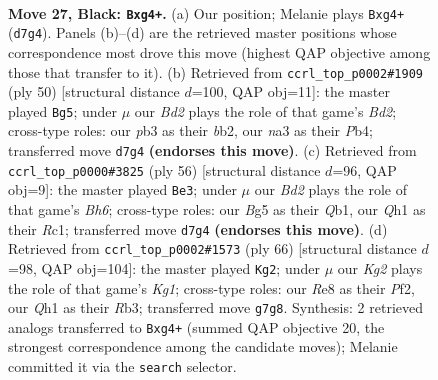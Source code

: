 \documentclass[11pt]{article}
\begin{document}
\clearpage

\begin{figure}[p]\centering
\begin{subfigure}{0.46\textwidth}\centering
\resizebox{\linewidth}{!}{%
\newchessgame
\chessboard[
  setfen={r3r3/1ppb2kp/5p2/p2p2b1/6P1/NPB1P3/P3KP2/RN5q b - - 2 27},
  showmover=false,
  pgfstyle=straightmove, color=movearrow, markmove={d7-g4}
]}
\caption{}
\end{subfigure}\hfill
\begin{subfigure}{0.46\textwidth}\centering
\resizebox{\linewidth}{!}{%
\newchessgame
\chessboard[
  setfen={3q4/1b1pnk2/p2p2r1/5p1Q/1P6/3P4/Pb1B2PP/4RR1K w - - 1 26},
  showmover=false,
  pgfstyle=straightmove, color=movearrow, markmove={d2-g5}
]}
\caption{}
\end{subfigure}
\\[4pt]
\begin{subfigure}{0.46\textwidth}\centering
\resizebox{\linewidth}{!}{%
\newchessgame
\chessboard[
  setfen={7r/1pbk1p1p/1rn1nPpB/pNp5/8/8/P5PP/1QR4K w - - 4 29},
  showmover=false,
  pgfstyle=straightmove, color=movearrow, markmove={h6-e3}
]}
\caption{}
\end{subfigure}\hfill
\begin{subfigure}{0.46\textwidth}\centering
\resizebox{\linewidth}{!}{%
\newchessgame
\chessboard[
  setfen={1r4k1/4npp1/r1pb3p/1p5P/3PB3/PR1R2P1/5P2/2B3K1 w - - 1 34},
  showmover=false,
  pgfstyle=straightmove, color=movearrow, markmove={g1-g2}
]}
\caption{}
\end{subfigure}
\caption{\textbf{Move 27, Black: \texttt{Bxg4+}.} (a) Our position; Melanie plays \texttt{Bxg4+} (\texttt{d7g4}). Panels (b)--(d) are the retrieved master positions whose correspondence most drove this move (highest QAP objective among those that transfer to it). (b) Retrieved from \texttt{ccrl\_top\_p0002\#1909} (ply 50) [structural distance $d$=100, QAP obj=11]: the master played \texttt{Bg5}; under $\mu$ our \emph{Bd2} plays the role of that game's \emph{Bd2}; cross-type roles: our \emph{p}b3 as their \emph{b}b2, our \emph{n}a3 as their \emph{P}b4; transferred move \texttt{d7g4} \textbf{(endorses this move)}. (c) Retrieved from \texttt{ccrl\_top\_p0000\#3825} (ply 56) [structural distance $d$=96, QAP obj=9]: the master played \texttt{Be3}; under $\mu$ our \emph{Bd2} plays the role of that game's \emph{Bh6}; cross-type roles: our \emph{B}g5 as their \emph{Q}b1, our \emph{Q}h1 as their \emph{R}c1; transferred move \texttt{d7g4} \textbf{(endorses this move)}. (d) Retrieved from \texttt{ccrl\_top\_p0002\#1573} (ply 66) [structural distance $d$=98, QAP obj=104]: the master played \texttt{Kg2}; under $\mu$ our \emph{Kg2} plays the role of that game's \emph{Kg1}; cross-type roles: our \emph{R}e8 as their \emph{P}f2, our \emph{Q}h1 as their \emph{R}b3; transferred move \texttt{g7g8}. Synthesis: 2 retrieved analogs transferred to \texttt{Bxg4+} (summed QAP objective 20, the strongest correspondence among the candidate moves); Melanie committed it via the \texttt{search} selector.}
\label{fig:thought-m53}
\end{figure}
\end{document}
